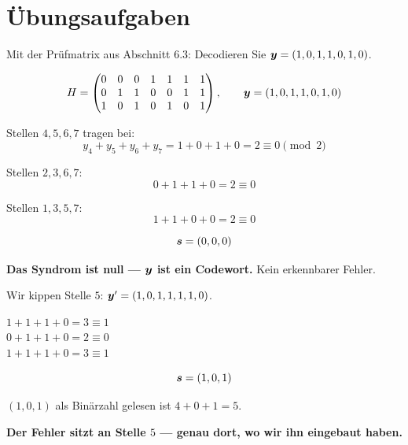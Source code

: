 \section{Übungsaufgaben}

\begin{aufgabe}
Mit der Prüfmatrix aus Abschnitt 6.3: Decodieren Sie $\boldsymbol{y} = (1,0,1,1,0,1,0)$.

\loesung
{}
\[ H = \begin{pmatrix}
0&0&0&1&1&1&1\\
0&1&1&0&0&1&1\\
1&0&1&0&1&0&1
\end{pmatrix}, \qquad \boldsymbol{y} = (1,0,1,1,0,1,0) \]

 Stellen $4,5,6,7$ tragen bei:
\[ y_4+y_5+y_6+y_7 = 1+0+1+0 = 2 \equiv 0 \pmod 2 \]

 Stellen $2,3,6,7$:
\[ 0+1+1+0 = 2 \equiv 0 \]

 Stellen $1,3,5,7$:
\[ 1+1+0+0 = 2 \equiv 0 \]

\[ \boldsymbol{s} = (0,0,0) \]

\begin{center}
\begin{minipage}{0.9\textwidth}
\textbf{Das Syndrom ist null --- $\boldsymbol{y}$ ist ein Codewort.} Kein erkennbarer Fehler.
\end{minipage}
\end{center}

Wir kippen Stelle $5$: $\boldsymbol{y}' = (1,0,1,1,1,1,0)$.

 $1+1+1+0 = 3 \equiv 1$\\
 $0+1+1+0 = 2 \equiv 0$\\
 $1+1+1+0 = 3 \equiv 1$

\[ \boldsymbol{s} = (1,0,1) \]

$(1,0,1)$ als Binärzahl gelesen ist $4+0+1 = 5$.

\begin{center}
\begin{minipage}{0.9\textwidth}
\textbf{Der Fehler sitzt an Stelle $5$ --- genau dort, wo wir ihn eingebaut haben.} \checkmark
\end{minipage}
\end{center}


\end{aufgabe}
